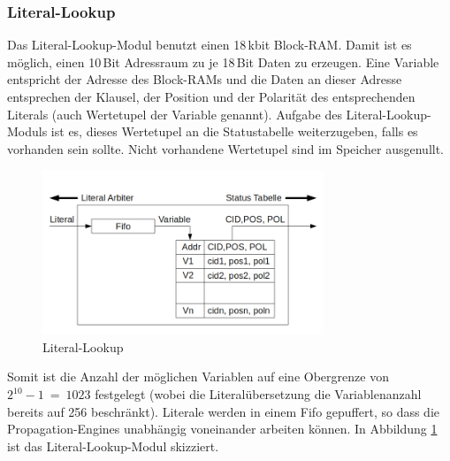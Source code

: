 \subsubsection{Literal-Lookup}
Das Literal-Lookup-Modul benutzt einen 18\,kbit Block-RAM. 
Damit ist es möglich, einen 10\,Bit Adressraum zu je 18\,Bit
Daten zu erzeugen. Eine Variable entspricht der Adresse des 
Block-RAMs und die Daten an dieser Adresse entsprechen der Klausel,
der Position und der Polarität des entsprechenden Literals (auch Wertetupel
der Variable genannt). Aufgabe des Literal-Lookup-Moduls
ist es, dieses Wertetupel an die Statustabelle weiterzugeben, 
falls es vorhanden sein sollte. Nicht vorhandene Wertetupel
sind im Speicher ausgenullt.
\begin{figure}[h]
  \includegraphics[width=0.75\textwidth]{abb/literal_lookup.png}
  \caption{Literal-Lookup}
  \label{literal_lookup}
\end{figure}
Somit ist die Anzahl der möglichen Variablen auf eine Obergrenze
von $2^{10}-1\ =\ 1023$ festgelegt (wobei die Literalübersetzung
die Variablenanzahl bereits auf 256 beschränkt). Literale werden in einem
Fifo gepuffert, so dass die Propagation-Engines unabhängig voneinander
arbeiten können. In Abbildung \ref{literal_lookup} ist das Literal-Lookup-Modul skizziert.


